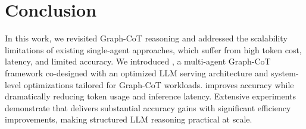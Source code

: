 \section{Conclusion}

In this work, we revisited Graph-CoT reasoning and addressed the scalability limitations of existing single-agent approaches, which suffer from high token cost, latency, and limited accuracy. We introduced \projectname, a multi-agent Graph-CoT framework co-designed with an optimized LLM serving architecture and system-level optimizations tailored for Graph-CoT workloads. \projectname improves accuracy while dramatically reducing token usage and inference latency. Extensive experiments demonstrate that \projectname delivers substantial accuracy gains with significant efficiency improvements, making structured LLM reasoning practical at scale.

